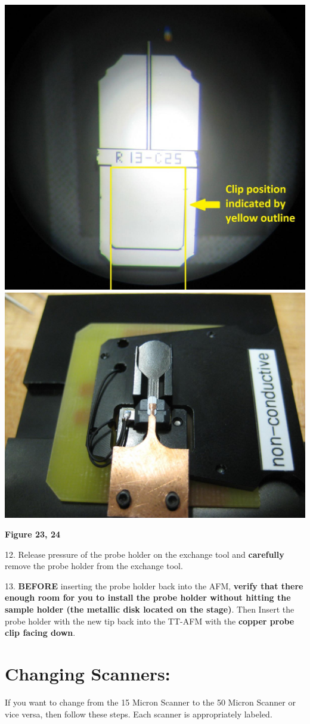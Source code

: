 \documentclass{../lab}
\begin{document}
\noindent
\href{http://dev-physicsadv.pantheon.berkeley.edu/sites/default/files/AFMImages/23.JPG}{\includegraphics[width=0.33\linewidth,keepaspectratio]{images/23.JPG}}
\href{http://experimentationlab.berkeley.edu/sites/default/files/IMG_4053.JPG}{\includegraphics[width=0.33\linewidth,keepaspectratio]{images/IMG_4053.JPG}}

\textbf{Figure 23, 24}

12.  Release pressure of the probe holder on the exchange tool and \textbf{carefully} remove the probe holder from the exchange tool.

13. \textbf{BEFORE} inserting the probe holder back into the AFM, \textbf{verify that there enough room for you to install the probe holder without hitting the sample holder (the metallic disk located on the stage)}.  Then Insert the probe holder with the new tip back into the TT-AFM with the \textbf{copper probe clip facing down}.

\section{Changing Scanners:}

If you want to change from the 15 Micron Scanner to the 50 Micron Scanner or vice versa, then follow these steps. Each scanner is appropriately labeled.
\end{document}

